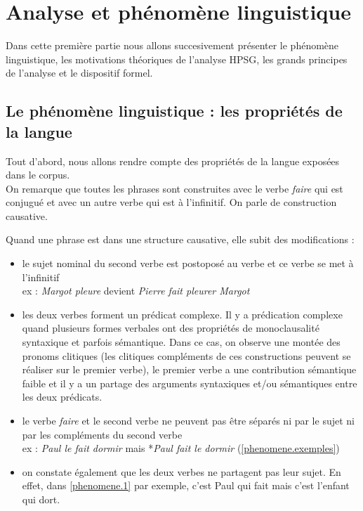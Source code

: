 %

\section {Analyse et phénomène linguistique}

Dans cette première partie nous allons succesivement présenter le phénomène linguistique, les motivations théoriques de l'analyse HPSG, les grands principes de l'analyse et le dispositif formel.

\newpage

\subsection{Le phénomène linguistique : les propriétés de la langue}

Tout d'abord, nous allons rendre compte des propriétés de la langue exposées dans le corpus.\\

On remarque que toutes les phrases sont construites avec le verbe \emph{faire} qui est conjugué et avec un autre verbe qui est à l'infinitif.
On parle de construction causative.

Quand une phrase est dans une structure causative, elle subit des modifications : \\

\begin{itemize}
  \item le sujet nominal du second verbe est postoposé au verbe et ce verbe se met à l'infinitif\\
    ex : \emph{Margot pleure} devient \emph{Pierre fait pleurer Margot}
  \item les deux verbes forment un prédicat complexe.
    Il y a prédication complexe quand plusieurs formes verbales ont des	propriétés de monoclausalité syntaxique et parfois sémantique.
    Dans ce cas, on observe une montée des pronoms clitiques (les clitiques compléments de ces constructions peuvent se réaliser sur le premier verbe), le premier verbe a une contribution sémantique faible et il y a un partage des arguments syntaxiques et/ou sémantiques entre les deux prédicats.
  \item le verbe \emph{faire} et le second verbe ne peuvent pas être séparés ni par le sujet ni par les compléments du second verbe\\
    ex \label{phenomene.1}: \emph{Paul le fait dormir} mais *\emph{Paul fait le dormir} (\autoref{phenomene.exemples})
  \item on constate également que les deux verbes ne partagent pas leur sujet.
    En effet, dans \autoref{phenomene.1} par exemple, c'est Paul qui fait mais c'est l'enfant qui dort.
\end{itemize}~{}\\

